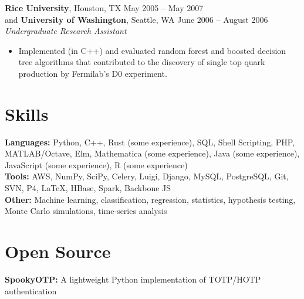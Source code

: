 \documentclass[margin,line]{resume}
\begin{document}
\begin{resume}
    \textbf{Rice University}, Houston, TX \hfill May 2005 -- May 2007 \vspace{1mm}\\\vspace{1mm}%
    and \textbf{University of Washington}, Seattle, WA \hfill June 2006 -- August 2006 \vspace{1mm}\\\vspace{1mm}%
    \textsl{Undergraduate Research Assistant}
    \begin{itemize}
    \item Implemented (in C++) and evaluated random forest and boosted decision tree algorithms that contributed to the discovery of single top quark production by Fermilab's D0 experiment.
    \end{itemize}
    
    \section{\mysidestyle Skills}\vspace{0mm}%
    \textbf{Languages:} Python, C++, Rust (some experience), SQL, Shell Scripting, PHP, MATLAB/Octave, Elm, Mathematica (some experience), Java (some experience), JavaScript (some experience), R (some experience)
    \vspace{1mm}\\\vspace{0mm}%
    \textbf{Tools:} AWS, NumPy, SciPy, Celery, Luigi, Django, MySQL, PostgreSQL, Git, SVN, P4, \LaTeX, HBase, Spark, Backbone JS
    \vspace{1mm}\\\vspace{0mm}%
    \textbf{Other:} Machine learning, classification, regression, statistics, hypothesis testing, Monte Carlo simulations, time-series analysis

    \section{\mysidestyle Open Source}\vspace{0mm}%
    \textbf{SpookyOTP:} A lightweight Python implementation of TOTP/HOTP authentication
    \vspace{1mm}\\\vspace{0mm}%
    

\end{resume}
\end{document}
